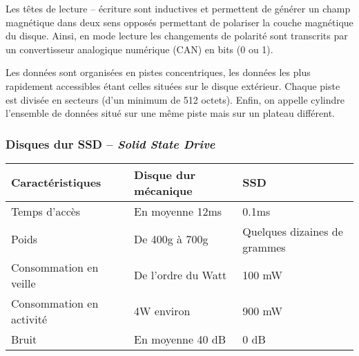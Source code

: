 Les têtes de lecture -- écriture sont inductives et permettent de générer un champ magnétique dans deux sens opposés permettant de polariser la couche magnétique du disque. Ainsi, en mode lecture les changements de polarité sont transcrits par un convertisseur analogique numérique (CAN) en bits (0 ou 1).

Les données sont organisées en pistes concentriques, les données les plus rapidement accessibles étant celles situées sur le disque extérieur. Chaque piste est divisée en secteurs (d'un minimum de 512 octets). Enfin, on appelle cylindre l'ensemble de données situé sur une même piste mais sur un plateau différent. 


%
%





\subsubsection{Disques dur SSD -- \textit{Solid State Drive}}




\begin{center}
\begin{tabular}{|l|l|l|}
\hline
\textbf{Caractéristiques} & \textbf{Disque dur mécanique} & \textbf{SSD} \\ \hline
Temps d'accès & En moyenne 12ms & 0.1ms \\ \hline
Poids & De 400g à 700g & Quelques dizaines de grammes \\ \hline
Consommation en veille & De l'ordre du Watt & 100 mW \\ \hline
Consommation en activité & 4W environ & 900 mW \\ \hline
Bruit  & En moyenne 40 dB & 0 dB\\ \hline
\end{tabular}
\end{center}

